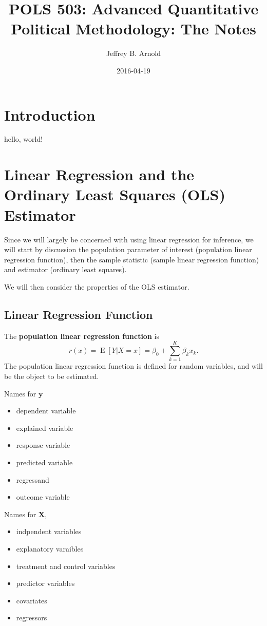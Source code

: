 \documentclass[]{book}
\title{POLS 503: Advanced Quantitative Political Methodology: The Notes}
\author{Jeffrey B. Arnold}
\date{2016-04-19}
\providecommand{\tightlist}{%
  \setlength{\itemsep}{0pt}\setlength{\parskip}{0pt}}
\DeclareMathOperator{\E}{E}
\newcommand{\mat}[1]{\boldsymbol{#1}}
\renewcommand{\vec}[1]{\boldsymbol{#1}}
\begin{document}
\maketitle

{
\setcounter{tocdepth}{1}
\tableofcontents
}
\chapter{Introduction}\label{introduction}

hello, world!

\chapter{Linear Regression and the Ordinary Least Squares (OLS)
Estimator}\label{linear-regression-and-the-ordinary-least-squares-ols-estimator}

Since we will largely be concerned with using linear regression for
inference, we will start by discussion the population parameter of
interest (population linear regression function), then the sample
statistic (sample linear regression function) and estimator (ordinary
least squares).

We will then consider the properties of the OLS estimator.

\section{Linear Regression Function}\label{linear-regression-function}

The \textbf{population linear regression function} is \[
r(x) = \E[Y | X = x] = \beta_0 + \sum_{k = 1}^{K} \beta_{k} x_k .
\] The population linear regression function is defined for random
variables, and will be the object to be estimated.

Names for \(\vec{y}\)

\begin{itemize}
\tightlist
\item
  dependent variable
\item
  explained variable
\item
  response variable
\item
  predicted variable
\item
  regressand
\item
  outcome variable
\end{itemize}

Names for \(\mat{X}\),

\begin{itemize}
\tightlist
\item
  indpendent variables
\item
  explanatory varaibles
\item
  treatment and control variables
\item
  predictor variables
\item
  covariates
\item
  regressors
\end{itemize}
\end{document}
